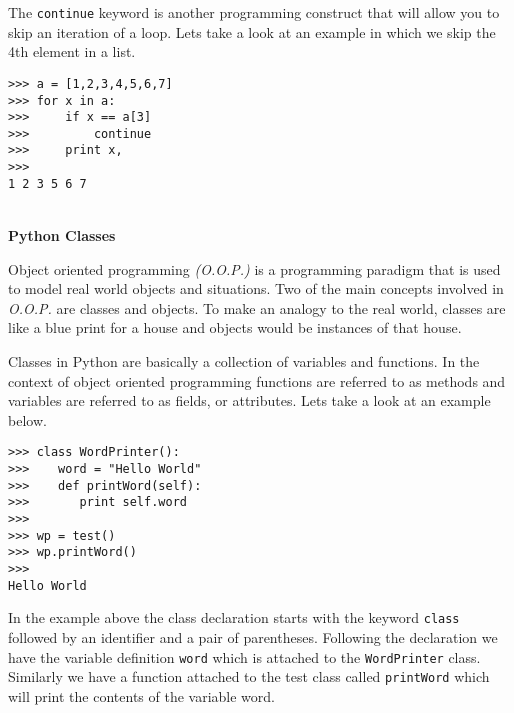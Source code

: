 \documentclass[letterpaper,11pt]{article}
\begin{document}
\par{The \texttt{continue} keyword is another programming construct that will
allow you to skip an iteration of a loop. Lets take a look at an example in
which we skip the 4th element in a list.}
\begin{minipage}{.5\textwidth}
    \begin{tcolorbox}
        \begin{footnotesize}
            \begin{verbatim}
>>> a = [1,2,3,4,5,6,7]
>>> for x in a:
>>>     if x == a[3]
>>>         continue 
>>>     print x,
>>>
1 2 3 5 6 7
            \end{verbatim}
        \end{footnotesize}
    \end{tcolorbox}
\end{minipage}
\\
\textbf{Python Classes}
\par{Object oriented programming \textit{(O.O.P.)} is a programming paradigm
    that is used to model real world objects and situations. Two of the main
    concepts involved in \textit{O.O.P.} are classes and objects. To make an
    analogy to the real world, classes are like a blue print for a house and
objects would be instances of that house.}
\par{Classes in Python are basically a collection of variables and functions. In
the context of object oriented programming functions are referred to as methods
and variables are referred to as fields, or attributes. Lets take a look at an
example below.}
\\ 
\begin{minipage}{.5\textwidth}
    \begin{tcolorbox}
        \begin{footnotesize}
            \begin{verbatim}
>>> class WordPrinter():
>>>    word = "Hello World"
>>>    def printWord(self):
>>>       print self.word
>>>
>>> wp = test()
>>> wp.printWord()
>>>
Hello World
            \end{verbatim}
        \end{footnotesize}
    \end{tcolorbox}
\end{minipage}
\par{In the example above the class declaration starts with the keyword
\texttt{class} followed by an identifier and a pair of parentheses. Following
the declaration we have the variable definition \texttt{word} which is
attached to the \texttt{WordPrinter} class. Similarly we have a function attached to the
test class called \texttt{printWord} which will print the contents of the
variable word.}
\end{document}
